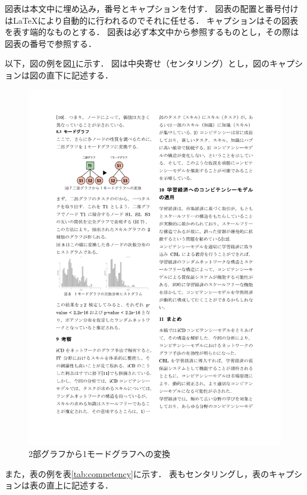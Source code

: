 \documentclass[a4paper,twocolumn,10pt]{ltjsarticle}
\begin{document}
図表は本文中に埋め込み，番号とキャプションを付す．
図表の配置と番号付けは\LaTeX{}により自動的に行われるのでそれに任せる．
キャプションはその図表を表す端的なものとする．
図表は必ず本文中から参照するものとし，その際は図表の番号で参照する．

以下，図の例を図\ref{fig:graphs}に示す．
図は中央寄せ（センタリング）とし，図のキャプションは図の直下に記述する．

\begin{figure}[htb]
 \begin{center}
  \includegraphics{graphs.pdf}
  \caption{2部グラフから1モードグラフへの変換}
  \label{fig:graphs}
 \end{center}
\end{figure}

また，表の例を表\ref{tab:competency}に示す．
表もセンタリングし，表のキャプションは表の直上に記述する．
\end{document}

